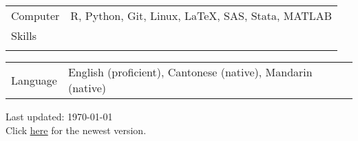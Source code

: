 \documentclass[letterpaper, 11pt]{article}
\begin{document}
\noindent \begin{tabular}{@{} p{3cm} l}
	\Large{Computer}  & R, Python, Git, Linux, \LaTeX, SAS, Stata, MATLAB  \\
	\Large{Skills}    &  \\
	& \\
\end{tabular}





\noindent \begin{tabular}{@{} p{3cm} l}
	\Large{Language}  & English (proficient), Cantonese (native), Mandarin (native)   \\
\end{tabular}





\vspace{1cm}

\begin{center}
  \begin{footnotesize}
    Last updated: \today \\
    Click \href{https://jiachenghe.github.io/files/cv/CV.pdf}{\underline{here}} for the newest version.
  \end{footnotesize}
\end{center}
\end{document}
